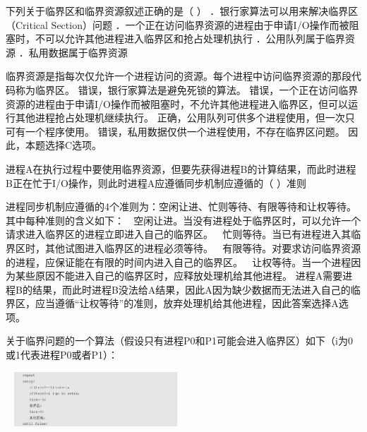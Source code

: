 \question 下列关于临界区和临界资源叙述正确的是（ ）
．银行家算法可以用来解决临界区（Critical Section）问题
．一个正在访问临界资源的进程由于申请I/O操作而被阻塞时，不可以允许其他进程进入临界区和抢占处理机执行
．公用队列属于临界资源 ．私用数据属于临界资源
\par{}
\begin{solution}临界资源是指每次仅允许一个进程访问的资源。每个进程中访问临界资源的那段代码称为临界区。
错误，银行家算法是避免死锁的算法。
错误，一个正在访问临界资源的进程由于申请I/O操作而被阻塞时，不允许其他进程进入临界区，但可以运行其他进程抢占处理机继续执行。
正确，公用队列可供多个进程使用，但一次只可有一个程序使用。
错误，私用数据仅供一个进程使用，不存在临界区问题。
因此，本题选择C选项。
\end{solution}
\question 进程A在执行过程中要使用临界资源，但要先获得进程B的计算结果，而此时进程B正在忙于I/O操作，则此时进程A应遵循同步机制应遵循的（
）准则
\par{}
\begin{solution}进程同步机制应遵循的4个准则为：空闲让进、忙则等待、有限等待和让权等待。其中每种准则的含义如下：

空闲让进。当没有进程处于临界区时，可以允许一个请求进入临界区的进程立即进入自己的临界区。
 忙则等待。当已有进程进入其临界区时，其他试图进入临界区的进程必须等待。

有限等待。对要求访问临界资源的进程，应保证能在有限的时间内进入自己的临界区。

让权等待。当一个进程因为某些原因不能进入自己的临界区时，应释放处理机给其他进程。
进程A需要进程B的结果，而此时进程B没法给A结果，因此A因为缺少数据而无法进入自己的临界区，应当遵循``让权等待''的准则，放弃处理机给其他进程，因此答案选择A选项。
\end{solution}
\question 关于临界问题的一个算法（假设只有进程P0和P1可能会进入临界区）如下（i为0或1代表进程P0或者P1）：

~
\includegraphics[width=2.42708in,height=0.80208in]{computerassets/00E4058A40E4544DAAE1BEED564B9DB8.png}

